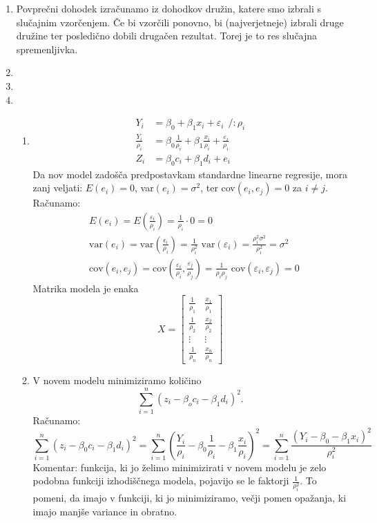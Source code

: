 \documentclass[12pt, letterpaper, twoside]{article}
\begin{document}
\begin{enumerate}
\begin{enumerate}
	\end{enumerate}
	\item Povprečni dohodek izračunamo iz dohodkov družin, katere smo izbrali s slučajnim vzorčenjem. Če bi vzorčili ponovno, bi (najverjetneje) izbrali druge družine ter posledično dobili drugačen rezultat. Torej je to res slučajna spremenljivka.
	\item
	\item
	\item 
	\begin{enumerate}
		\item \begin{align*}
		Y_i & = \beta_0 + \beta_1 x_i + \varepsilon_i ~~/ : \rho_i  \\
		\frac{Y_i}{\rho_i} &= \beta_0 \frac{1}{\rho_i}+\beta_1 \frac{x_i}{\rho_i}+\frac{\varepsilon_i}{\rho_i} \\
		Z_i &= \beta_0 c_i + \beta_1 d_i + e_i
		\end{align*}
		Da nov model zadošča predpostavkam standardne linearne regresije, mora zanj veljati: $E(e_i)=0$, var$(e_i)=\sigma^2$, ter cov$(e_i,e_j)=0$ za $i\neq j.$ Računamo:
		\begin{align*}
		&E(e_i) = E\left(\frac{\varepsilon_i}{\rho_i}\right) =\frac{1}{\rho_i}\cdot 0 = 0 \\
		&\text{var}(e_i)=\text{var}\left(\frac{\epsilon_i}{\rho_i}\right)=\frac{1}{\rho_i^2}\text{ var}(\varepsilon_i)=\frac{\rho_i^2 \sigma^2}{\rho_i^2}=\sigma^2 \\
		&\text{cov}(e_i,e_j)=\text{cov}\left(\frac{\varepsilon_i}{\rho_i},\frac{\varepsilon_j}{\rho_j}\right)=\frac{1}{\rho_i \rho_j}\text{ cov}(\varepsilon_i,\varepsilon_j)=0
		\end{align*}
		Matrika modela je enaka 
		 \[ X =
		\begin{bmatrix}
		\frac{1}{\rho_1}       & \frac{x_1}{\rho_1}  \\
		\frac{1}{\rho_2}       & \frac{x_2}{\rho_2}  \\
		\vdots				   & \vdots \\
		\frac{1}{\rho_n}       & \frac{x_n}{\rho_n}  
		\end{bmatrix}
		\]
		\item V novem modelu minimiziramo količino
		$$\sum_{i=1}^{n}(z_i-\beta_o c_i-\beta_1 d_i)^2.$$
		Računamo:
		$$\sum_{i=1}^{n}(z_i-\beta_0 c_i-\beta_1 d_i)^2 =\sum_{i=1}^{n}\left(\frac{Y_i}{\rho_i}-\beta_0 \frac{1}{\rho_i}-\beta_1 \frac{x_i}{\rho_i}\right)^2=\sum_{i=1}^{n}\frac{(Y_i-\beta_0-\beta_1 x_i)^2}{\rho_i^2}$$
		Komentar: funkcija, ki jo želimo minimizirati v novem modelu je zelo podobna funkciji izhodiščnega modela, pojavijo se le faktorji $\frac{1}{\rho_i^2}$. To pomeni, da imajo v funkciji, ki jo minimiziramo, večji pomen opažanja, ki imajo manjše variance in obratno.

\end{enumerate}
\end{enumerate}
\end{document}
